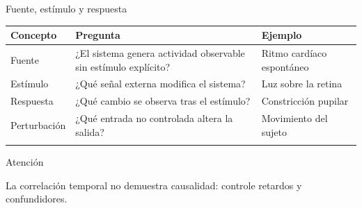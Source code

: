 \documentclass[
  10pt,
  ignorenonframetext,
  aspectratio=169,
  spanish,
]{beamer}
\begin{document}
\begin{frame}{Fuente, estímulo y respuesta}
\label{d1-013}
\begin{longtable}[]{@{}
  >{\raggedright\arraybackslash}p{}
  >{\raggedright\arraybackslash}p{}
  >{\raggedright\arraybackslash}p{}@{}}
\toprule\noalign{}
\begin{minipage}[b]{\linewidth}\raggedright
Concepto
\end{minipage} & \begin{minipage}[b]{\linewidth}\raggedright
Pregunta
\end{minipage} & \begin{minipage}[b]{\linewidth}\raggedright
Ejemplo
\end{minipage} \\
\midrule\noalign{}
\endhead
Fuente & ¿El sistema genera actividad observable sin estímulo explícito?
& Ritmo cardíaco espontáneo \\
Estímulo & ¿Qué señal externa modifica el sistema? & Luz sobre la
retina \\
Respuesta & ¿Qué cambio se observa tras el estímulo? & Constricción
pupilar \\
Perturbación & ¿Qué entrada no controlada altera la salida? & Movimiento
del sujeto \\
\bottomrule\noalign{}
\end{longtable}

\begin{alertblock}{Atención}

La correlación temporal no demuestra causalidad: controle retardos y
confundidores.

\end{alertblock}

\end{frame}
\end{document}
